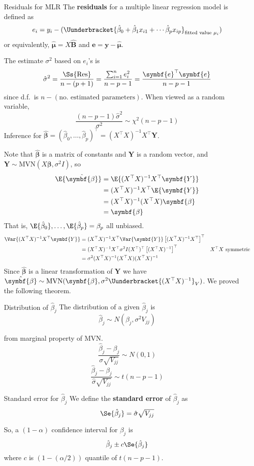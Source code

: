 \begin{Definition}{Residuals for MLR}{}
    The \textbf{residuals} for a multiple linear regression model is defined
    as
    \[ e_i=y_i-(\Uunderbracket{\hat{\beta}_0+\hat{\beta}_1x_{i1}+\cdots\hat{\beta}_p x_{ip}
        }_{\text{fitted value }\mu_i}) \]
    or equivalently, $ \hat{\symbf{\mu}}=X\hat{\symbf{B}} $ and
    $ \symbf{e}=\symbf{y}-\hat{\symbf{\mu}} $.
\end{Definition}
The estimate $ \sigma^2 $ based on $ e_i $'s is
\[ \hat{\sigma}^2=\frac{\Ss{\text{Res}}}{n-(p+1)}=
    \frac{\sum_{i=1}^{n} e_i^2}{n-p-1}=\frac{\symbf{e}^\top\symbf{e}}{n-p-1}  \]
since d.f.\ is $ n-(\text{no.\ estimated parameters}) $. When viewed
as a random variable,
\[ \frac{(n-p-1)\hat{\sigma}^2}{\sigma^2}\sim \chi^2(n-p-1)  \]
Inference for $ \hat{\symbf{\beta}}=(\hat{\beta}_0,\ldots,\hat{\beta}_p)^\top
    =(X^\top X)^{-1}X^\top \symbf{Y} $.

Note that $ \hat{\symbf{\beta}} $ is a matrix of constants and
$ \symbf{Y} $ is a random vector, and
$ \symbf{Y}\sim \text{MVN}(X\symbf{\beta},\sigma^2 I) $, so
\begin{align*}
    \E{\hat{\symbf{\beta}}}
     & =\E{(X^\top X)^{-1}X^\top \symbf{Y}}    \\
     & =(X^\top X)^{-1}X^\top\E{\symbf{Y}}     \\
     & =(X^\top X)^{-1}(X^\top X)\symbf{\beta} \\
     & =\symbf{\beta}
\end{align*}
That is, $ \E{\hat{\beta}_0},\ldots,\E{\hat{\beta}_p}=\beta_p $
all unbiased.
\begin{align*}
    \Var{(X^\top X)^{-1}X^\top\symbf{Y}}
     & =(X^\top X)^{-1}X^{\top}\Var{\symbf{Y}}\left[ (X^\top X)^{-1}X^\top \right]^\top                              \\
     & =(X^\top X)^{-1}X^\top \sigma^2 I(X^\top)^\top\left[ (X^\top X)^{-1} \right]^\top & X^\top X\text{ symmetric} \\
     & =\sigma^2(X^\top X)^{-1}(X^\top X)(X^\top X)^{-1}
\end{align*}
Since $ \hat{\symbf{\beta}} $ is a linear transformation of $ \symbf{Y} $
we have
$ \hat{\symbf{\beta}} \sim \text{MVN}(\symbf{\beta},\sigma^2
    \Uunderbracket{(X^\top X)^{-1}}_{V}) $. We proved the following theorem.
\begin{Theorem}{Distribution of $ \hat{\beta}_j $}{}
    The distribution of a given $ \hat{\beta}_j $ is
    \[ \hat{\beta}_j \sim N(\beta_j,\sigma^2 V_{jj}) \]
\end{Theorem}
from marginal property of MVN.\
\[ \frac{\hat{\beta}_j-\beta_j}{\sigma\sqrt{V_{jj}}} \sim N(0,1)  \]
\[ \frac{\hat{\beta}_j-\beta_j}{\hat{\sigma}\sqrt{V_{jj}}} \sim t(n-p-1)  \]
\begin{Definition}{Standard error for $ \hat{\beta}_j $}{}
    We define the \textbf{standard error} of $ \hat{\beta}_j $ as
    \[ \Se{\hat{\beta}_j}=\hat{\sigma}\sqrt{V_{jj}} \]
\end{Definition}
So, a $ (1-\alpha) $ confidence interval for $ \beta_j $
is
\[ \hat{\beta}_j\pm c\Se{\hat{\beta}_j} \]
where $ c $ is $ (1-(\alpha/2)) $ quantile of $ t(n-p-1) $.

